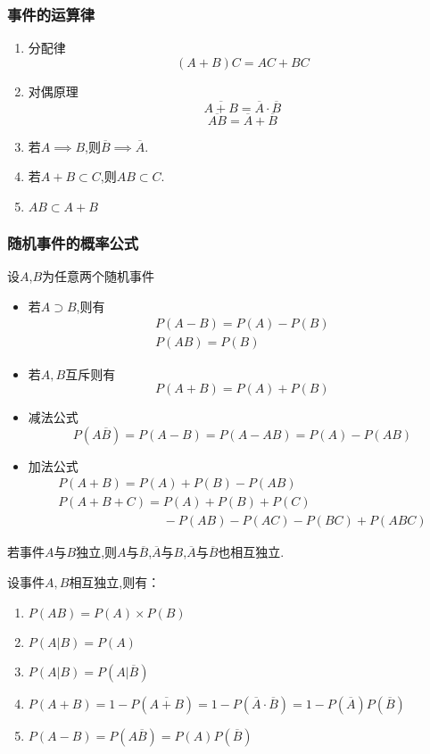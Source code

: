 \subsubsection{事件的运算律}
\begin{enumerate}
    \item 分配律
    \[(A+B)C=AC+BC\]
    \item 对偶原理
    \[\overline{A+B}=\overline{A}\cdot\overline{B}\]
    \[\overline{AB}=\overline{A}+\overline{B}\]
    \item 若$A \implies B$,则$\overline{B} \implies \overline{A}$.
    \item 若$A+B\subset C$,则$AB\subset C$.
    \item $AB\subset A+B$
\end{enumerate}
\subsubsection{随机事件的概率公式}
设$A$,$B$为任意两个随机事件
\begin{itemize}
\item 若$A\supset B$,则有
\begin{gather*}
    P(A-B)=P(A)-P(B)\\
    P(AB)=P(B)
\end{gather*}
\item 若$A,B$互斥则有
\begin{equation*}
    P(A+B)=P(A)+P(B)
\end{equation*}
\item 减法公式
\[P(A \overline{B})=P(A-B)=P(A-AB)=P(A)-P(AB)\]
\item 加法公式
\begin{gather*}
    P(A+B)=P(A)+P(B)-P(AB)\\
    P(A+B+C)=P(A)+P(B)+P(C)\\
    \phantom{P(A+B+C)=}-P(AB)-P(AC)-P(BC)+P(ABC)
\end{gather*}
\end{itemize}

\begin{ttheorem}
    若事件$A$与$B$独立,则$A$与$\overline{B} $,$\overline{A} $与$B$,$\overline{A} $与$\overline{B} $也相互独立.
\end{ttheorem}

设事件$A,B$相互独立,则有：
\begin{enumerate}
    \item $P(AB)=P(A)\times P(B)$
    \item $P(A\vert B)=P(A)$
    \item $P(A\vert B)=P(A\vert \overline{B})$
    \item $P(A+B)=1-P(\overline{A+B} )=1-P(\overline{A}\cdot\overline{B} )=1-P(\overline{A} )P(\overline{B} )$
    \item $P(A-B)=P(A\overline{B} )=P(A)P(\overline{B} )$
\end{enumerate}

